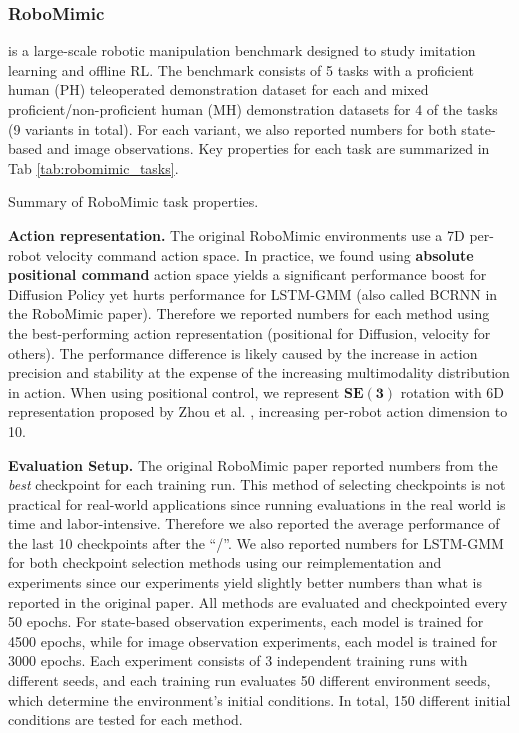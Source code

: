 \subsubsection{\textbf{RoboMimic}} \cite{robomimic} is a large-scale robotic manipulation benchmark designed to study imitation learning and offline RL. The benchmark consists of 5 tasks with a proficient human (PH) teleoperated demonstration dataset for each and mixed proficient/non-proficient human (MH) demonstration datasets for 4 of the tasks (9 variants in total). For each variant, we also reported numbers for both state-based and image observations. Key properties for each task are summarized in Tab \ref{tab:robomimic_tasks}.

\begin{table}
\centering

\caption{Summary of RoboMimic \cite{robomimic} task properties. }
\label{tab:robomimic_tasks}
\end{table}

\textbf{Action representation.} The original RoboMimic environments \cite{robomimic} use a 7D per-robot velocity command action space. In practice, we found using \textbf{absolute positional command} action space yields a significant performance boost for Diffusion Policy yet hurts performance for LSTM-GMM (also called BCRNN in the RoboMimic paper). Therefore we reported numbers for each method using the best-performing action representation (positional for Diffusion, velocity for others). The performance difference is likely caused by the increase in action precision and stability at the expense of the increasing multimodality distribution in action. When using positional control, we represent $\mathbf{SE(3)}$ rotation with 6D representation proposed by Zhou et al. \cite{zhou2019continuity}, increasing per-robot action dimension to 10.

 \textbf{Evaluation Setup.} The original RoboMimic paper reported numbers from the \textit{best} checkpoint for each training run. This method of selecting checkpoints is not practical for real-world applications since running evaluations in the real world is time and labor-intensive. Therefore we also reported the average performance of the last 10 checkpoints after the ``/''. We also reported numbers for LSTM-GMM for both checkpoint selection methods using our reimplementation and experiments since our experiments yield slightly better numbers than what is reported in the original paper. All methods are evaluated and checkpointed every 50 epochs. For state-based observation experiments, each model is trained for 4500 epochs, while for image observation experiments, each model is trained for 3000 epochs. Each experiment consists of 3 independent training runs with different seeds, and each training run evaluates 50 different environment seeds, which determine the environment's initial conditions. In total, 150 different initial conditions are tested for each method.

